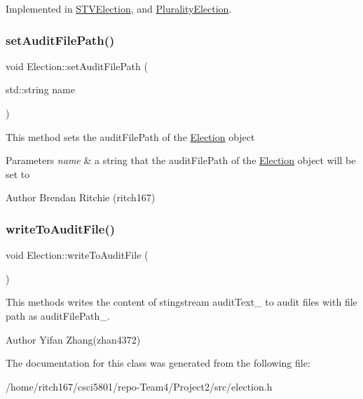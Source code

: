 Implemented in \hyperlink{classSTVElection_ac4e0339e3cb97add1a22c9af7233df17}{S\+T\+V\+Election}, and \hyperlink{classPluralityElection_a9517806e8ba40496c49013acc7ad9ca5}{Plurality\+Election}.

\mbox{\label{classElection_ad50f3b2f39c7e7ee96f1987c9dddb926}} 
\subsubsection{\texorpdfstring{set\+Audit\+File\+Path()}{setAuditFilePath()}}
{\footnotesize\ttfamily void Election\+::set\+Audit\+File\+Path (\begin{DoxyParamCaption}\item[{std\+::string}]{name }\end{DoxyParamCaption})\hspace{0.3cm}{\ttfamily [protected]}}

This method sets the audit\+File\+Path of the \hyperlink{classElection}{Election} object 
\begin{DoxyParams}{Parameters}
{\em name} & a string that the audit\+File\+Path of the \hyperlink{classElection}{Election} object will be set to \\
\hline
\end{DoxyParams}
\begin{DoxyAuthor}{Author}
Brendan Ritchie (ritch167) 
\end{DoxyAuthor}
\mbox{\label{classElection_abd52b6c894a9f2a0a0a104e9f290f9a7}} 
\subsubsection{\texorpdfstring{write\+To\+Audit\+File()}{writeToAuditFile()}}
{\footnotesize\ttfamily void Election\+::write\+To\+Audit\+File (\begin{DoxyParamCaption}{ }\end{DoxyParamCaption})\hspace{0.3cm}{\ttfamily [protected]}}

This methods writes the content of stingstream audit\+Text\+\_\+ to audit files with file path as audit\+File\+Path\+\_\+. \begin{DoxyAuthor}{Author}
Yifan Zhang(zhan4372) 
\end{DoxyAuthor}


The documentation for this class was generated from the following file\+:\begin{DoxyCompactItemize}
\item 
/home/ritch167/csci5801/repo-\/\+Team4/\+Project2/src/election.\+h\end{DoxyCompactItemize}

